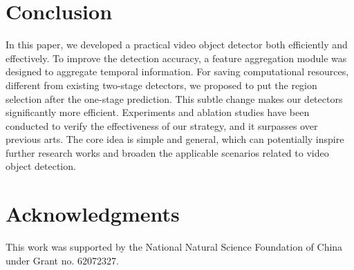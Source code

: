 \documentclass[letterpaper]{article} \usepackage{aaai23}  \usepackage{times}  \usepackage{helvet}  \usepackage{courier}  \usepackage[hyphens]{url}  \usepackage{graphicx} \urlstyle{rm} \def\UrlFont{\rm}  \usepackage{natbib}  \usepackage{caption} \usepackage{xcolor}
\begin{document}
\section{Conclusion}
\vspace{2mm}
In this paper, we developed a practical video object detector both efficiently and effectively. To improve the detection accuracy, a feature aggregation module was designed to aggregate temporal information. For saving computational resources, different from existing two-stage detectors, we proposed to put the region selection after the one-stage prediction. This subtle change makes our detectors significantly more efficient. 
Experiments and ablation studies have been conducted to verify the effectiveness of our strategy, and it surpasses over previous arts. The core idea is simple and general, which can potentially inspire further research works and broaden the applicable scenarios related to video object detection.


\section*{Acknowledgments}
This work was supported by the National Natural Science Foundation of China under Grant no. 62072327.



\end{document}
